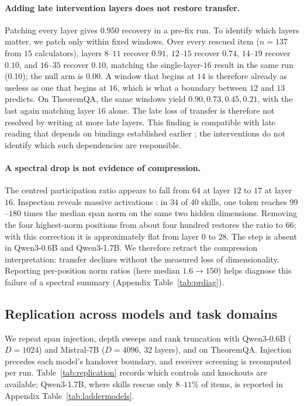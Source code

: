 \documentclass{article}
\begin{document}
\paragraph{Adding late intervention layers does not restore transfer.}
Patching every layer gives $0.950$ recovery in a pre-fix run. To identify which
layers matter, we patch only within fixed windows. Over every rescued item
($n=137$ from $15$ calculators), layers $8$--$11$ recover $0.91$,
$12$--$15$ recover $0.74$, $14$--$19$ recover $0.10$, and $16$--$35$ recover
$0.10$, matching the single-layer-$16$ result in the same run ($0.10$); the null
arm is $0.00$. A window that begins at $14$ is therefore already as useless as
one that begins at $16$, which is what a boundary between $12$ and $13$
predicts. On TheoremQA, the same windows yield $0.90,0.73,0.45,0.21$, with the
last again matching layer $16$ alone. The late loss of transfer is therefore not
resolved by writing at more late layers. This finding is compatible with late
reading that depends on bindings established earlier \citep{feng2024binding};
the interventions do not identify which such dependencies are responsible.

\paragraph{A spectral drop is not evidence of compression.}
The centred participation ratio appears to fall from $64$ at layer $12$ to
$17$ at layer $16$. Inspection reveals massive activations
\citep{sun2024massive, shi2026melayer}: in $34$ of $40$ skills, one token reaches
$99$--$180$ times the median span norm on the same two hidden dimensions.
Removing the four highest-norm positions from about four hundred restores the
ratio to $66$; with this correction it is approximately flat from layer $0$ to
$28$. The step is absent in Qwen3-0.6B and Qwen3-1.7B. We therefore retract the
compression interpretation: transfer declines without the measured loss of
dimensionality. Reporting per-position norm ratios (here median $1.6\to150$)
helps diagnose this failure of a spectral summary (Appendix
Table~\ref{tab:prdiag}).

\subsection{Replication across models and task domains}
\label{sec:ladder}

We repeat span injection, depth sweeps and rank truncation with Qwen3-0.6B
($D=1024$) and Mistral-7B ($D=4096$, $32$ layers), and on TheoremQA. Injection
precedes each model's handover boundary, and receiver screening is recomputed
per run. Table~\ref{tab:replication} records which controls and knockouts are
available; Qwen3-1.7B, where skills rescue only $8$--$11\%$ of items, is reported
in Appendix Table~\ref{tab:laddermodels}.
\end{document}
